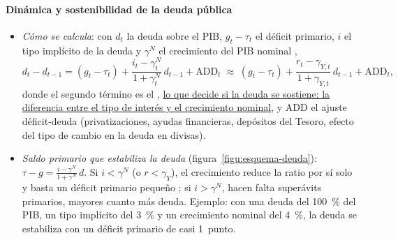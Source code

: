 \documentclass[11pt]{article}
\begin{document}
\paragraph{Dinámica y sostenibilidad de la deuda pública}
\begin{itemize}
\item \emph{Cómo se calcula}: con $d_t$ la deuda sobre el PIB, $g_t-\tau_t$ el déficit primario, $i$ el tipo implícito de la deuda y $\gamma^N$ el crecimiento del PIB nominal ,
\begin{equation}\label{eq:dinamica-deuda}
d_t-d_{t-1}=(g_t-\tau_t)+\frac{i_t-\gamma^N_t}{1+\gamma^N_t}\,d_{t-1}+\mathrm{ADD}_t\;\approx\;(g_t-\tau_t)+\frac{r_t-\gamma_{Y,t}}{1+\gamma_{Y,t}}\,d_{t-1}+\mathrm{ADD}_t ,
\end{equation}
donde el segundo término es el , \uline{lo que decide si la deuda se sostiene: la diferencia entre el tipo de interés y el crecimiento nominal}, y ADD el ajuste déficit-deuda (privatizaciones, ayudas financieras, depósitos del Tesoro, efecto del tipo de cambio en la deuda en divisas).
\item \emph{Saldo primario que estabiliza la deuda} (figura~\ref{figu:esquema-deuda}): $\tau-g=\frac{i-\gamma^N}{1+\gamma^N}\,d$. Si $i<\gamma^N$ (o $r<\gamma_Y$), el crecimiento reduce la ratio por sí solo y basta un déficit primario pequeño \parencite{Blanchard2019Deuda}; si $i>\gamma^N$, hacen falta superávits primarios, mayores cuanto más deuda. Ejemplo: con una deuda del 100~\% del PIB, un tipo implícito del 3~\% y un crecimiento nominal del 4~\%, la deuda se estabiliza con un déficit primario de casi 1~punto.
\end{itemize}

\begin{infografia}[!htb]
\centering
\caption{El efecto bola de nieve: tipo de interés frente a crecimiento nominal}\label{figu:esquema-deuda}
\end{infografia}
\end{document}
